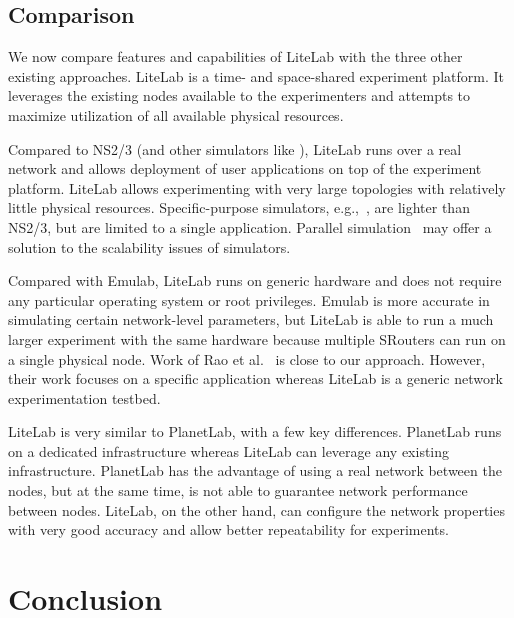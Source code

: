 \documentclass[conference]{IEEEtran}
\begin{document}
\subsection{Comparison}
\label{sec:comparison}




We now compare features and capabilities of LiteLab with the three
other existing approaches. LiteLab is a time- and space-shared
experiment platform. It leverages the existing nodes available to the
experimenters and attempts to maximize utilization of all available
physical resources.

Compared to NS2/3 (and other simulators like
\cite{disa2:omnet,ccnsim,ndnsim}), LiteLab runs over a real network
and allows deployment of user applications on top of the experiment
platform. LiteLab allows experimenting with very large topologies with
relatively little physical resources. Specific-purpose simulators,
e.g.,~\cite{PeerSim, CPE:CPE710, 4301435, YangW:GPS}, are lighter than
NS2/3, but are limited to a single application. Parallel
simulation~\cite{Fujimoto:1989:PDE:76738.76741} may offer a solution
to the scalability issues of simulators.






Compared with Emulab, LiteLab runs on generic hardware and does not
require any particular operating system or root privileges. Emulab is
more accurate in simulating certain network-level parameters, but
LiteLab is able to run a much larger experiment with the same hardware
because multiple SRouters can run on a single physical node.  Work of
Rao et al.~\cite{5569970} is close to our approach. However, their
work focuses on a specific application whereas LiteLab is a generic
network experimentation testbed.


LiteLab is very similar to PlanetLab, with a few key
differences. PlanetLab runs on a dedicated infrastructure whereas
LiteLab can leverage any existing infrastructure. PlanetLab has the
advantage of using a real network between the nodes, but at the same
time, is not able to guarantee network performance between
nodes. LiteLab, on the other hand, can configure the network
properties with very good accuracy and allow better repeatability for
experiments.



\section{Conclusion}
\label{sec:conclusion}
\end{document}
